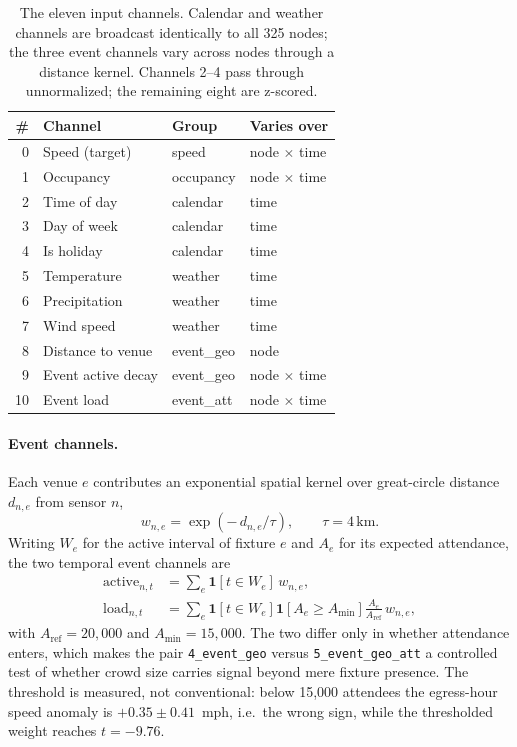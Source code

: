 \documentclass[letterpaper]{article}
\begin{document}
\begin{table}[t]
\centering
\small
\setlength{\tabcolsep}{4pt}
\begin{tabular}{@{}rlll@{}}
\toprule
\# & Channel & Group & Varies over \\
\midrule
0 & Speed (target) & speed & node $\times$ time \\
1 & Occupancy & occupancy & node $\times$ time \\
2 & Time of day & calendar & time \\
3 & Day of week & calendar & time \\
4 & Is holiday & calendar & time \\
5 & Temperature & weather & time \\
6 & Precipitation & weather & time \\
7 & Wind speed & weather & time \\
8 & Distance to venue & event\_geo & node \\
9 & Event active decay & event\_geo & node $\times$ time \\
10 & Event load & event\_att & node $\times$ time \\
\bottomrule
\end{tabular}
\caption{The eleven input channels. Calendar and weather channels are broadcast identically to all 325 nodes; the three event channels vary across nodes through a distance kernel. Channels 2--4 pass through unnormalized; the remaining eight are z-scored.}
\label{tab:channels}
\end{table}

\paragraph{Event channels.} Each venue $e$ contributes an exponential spatial kernel over great-circle distance $d_{n,e}$ from sensor $n$,
\begin{equation}
w_{n,e}=\exp\!\left(-\,d_{n,e}/\tau\right),\qquad \tau=4\,\text{km}.
\end{equation}
Writing $W_e$ for the active interval of fixture $e$ and $A_e$ for its expected attendance, the two temporal event channels are
\begin{align}
\text{active}_{n,t} &= \sum_{e} \mathbf{1}\!\left[t\in W_e\right]\, w_{n,e},\\
\text{load}_{n,t} &= \sum_{e} \mathbf{1}\!\left[t\in W_e\right]
   \mathbf{1}\!\left[A_e \ge A_{\min}\right]
   \frac{A_e}{A_{\text{ref}}}\, w_{n,e},
\end{align}
with $A_{\text{ref}}=20{,}000$ and $A_{\min}=15{,}000$. The two differ only in whether attendance enters, which makes the pair \texttt{4\_event\_geo} versus \texttt{5\_event\_geo\_att} a controlled test of whether crowd size carries signal beyond mere fixture presence. The threshold is measured, not conventional: below 15{,}000 attendees the egress-hour speed anomaly is $+0.35\pm0.41$~mph, i.e.\ the wrong sign, while the thresholded weight reaches $t=-9.76$.
\end{document}
